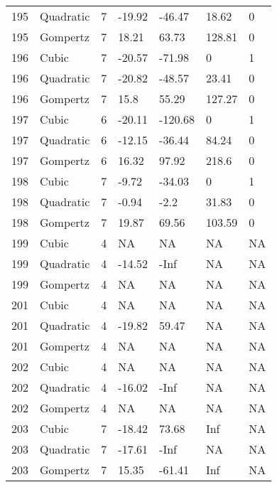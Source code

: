\documentclass[11pt]{article}
\begin{document}
\begin{center}
\begin{longtable}{lllllll}
    195 & Quadratic & 7               & -19.92  & -46.47  & 18.62   & 0    \\
    195 & Gompertz  & 7               & 18.21   & 63.73   & 128.81  & 0    \\
    196 & Cubic     & 7               & -20.57  & -71.98  & 0       & 1    \\
    196 & Quadratic & 7               & -20.82  & -48.57  & 23.41   & 0    \\
    196 & Gompertz  & 7               & 15.8    & 55.29   & 127.27  & 0    \\
    197 & Cubic     & 6               & -20.11  & -120.68 & 0       & 1    \\
    197 & Quadratic & 6               & -12.15  & -36.44  & 84.24   & 0    \\
    197 & Gompertz  & 6               & 16.32   & 97.92   & 218.6   & 0    \\
    198 & Cubic     & 7               & -9.72   & -34.03  & 0       & 1    \\
    198 & Quadratic & 7               & -0.94   & -2.2    & 31.83   & 0    \\
    198 & Gompertz  & 7               & 19.87   & 69.56   & 103.59  & 0    \\
    199 & Cubic     & 4               & NA      & NA      & NA      & NA   \\
    199 & Quadratic & 4               & -14.52  & -Inf    & NA      & NA   \\
    199 & Gompertz  & 4               & NA      & NA      & NA      & NA   \\
    201 & Cubic     & 4               & NA      & NA      & NA      & NA   \\
    201 & Quadratic & 4               & -19.82  & 59.47   & NA      & NA   \\
    201 & Gompertz  & 4               & NA      & NA      & NA      & NA   \\
    202 & Cubic     & 4               & NA      & NA      & NA      & NA   \\
    202 & Quadratic & 4               & -16.02  & -Inf    & NA      & NA   \\
    202 & Gompertz  & 4               & NA      & NA      & NA      & NA   \\
    203 & Cubic     & 7               & -18.42  & 73.68   & Inf     & NA   \\
    203 & Quadratic & 7               & -17.61  & -Inf    & NA      & NA   \\
    203 & Gompertz  & 7               & 15.35   & -61.41  & Inf     & NA   \\

\end{longtable}
\end{center}
\end{document}
